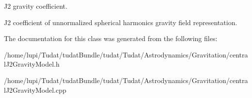 J2 gravity coefficient. 

J2 coefficient of unnormalized spherical harmonics gravity field representation. 

The documentation for this class was generated from the following files\+:\begin{DoxyCompactItemize}
\item 
/home/lupi/\+Tudat/tudat\+Bundle/tudat/\+Tudat/\+Astrodynamics/\+Gravitation/central\+J2\+Gravity\+Model.\+h\item 
/home/lupi/\+Tudat/tudat\+Bundle/tudat/\+Tudat/\+Astrodynamics/\+Gravitation/central\+J2\+Gravity\+Model.\+cpp\end{DoxyCompactItemize}

